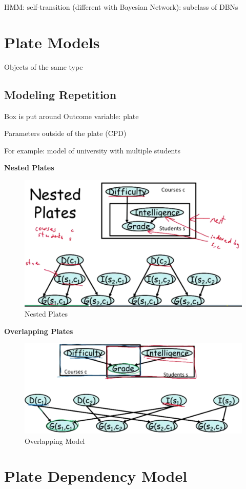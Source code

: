 \documentclass{book}
\begin{document}
HMM: self-transition (different with Bayesian Network): subclass of DBNs

\section{Plate Models}

Objects of the same type

\subsection{Modeling Repetition}

Box is put around Outcome variable: plate

Parameters outside of the plate (CPD)

For example: model of university with multiple students

\textbf{Nested Plates}

\begin{figure}[h]
\centering
\includegraphics[width=0.7\linewidth]{./figures/nestedplate}
\caption{Nested Plates}
\label{fig:nestedplate}
\end{figure}

\textbf{Overlapping Plates}

\begin{figure}[h]
\centering
\includegraphics[width=0.7\linewidth]{./figures/ovelapping}
\caption{Overlapping Model}
\label{fig:ovelapping}
\end{figure}


\section{Plate Dependency Model}
\end{document}
